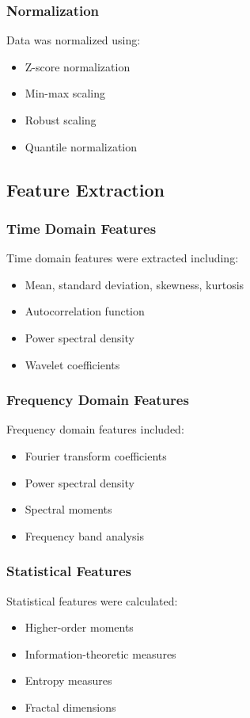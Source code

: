 \subsubsection{Normalization}
Data was normalized using:
\begin{itemize}
    \item Z-score normalization
    \item Min-max scaling
    \item Robust scaling
    \item Quantile normalization
\end{itemize}

\subsection{Feature Extraction}

\subsubsection{Time Domain Features}
Time domain features were extracted including:
\begin{itemize}
    \item Mean, standard deviation, skewness, kurtosis
    \item Autocorrelation function
    \item Power spectral density
    \item Wavelet coefficients
\end{itemize}

\subsubsection{Frequency Domain Features}
Frequency domain features included:
\begin{itemize}
    \item Fourier transform coefficients
    \item Power spectral density
    \item Spectral moments
    \item Frequency band analysis
\end{itemize}

\subsubsection{Statistical Features}
Statistical features were calculated:
\begin{itemize}
    \item Higher-order moments
    \item Information-theoretic measures
    \item Entropy measures
    \item Fractal dimensions
\end{itemize}

